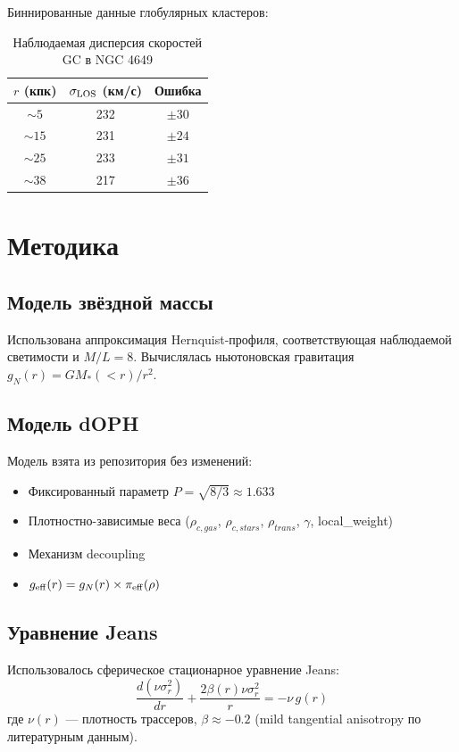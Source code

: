 \documentclass[12pt,a4paper]{article}
\begin{document}
Биннированные данные глобулярных кластеров:

\begin{table}[h]
\centering
\begin{tabular}{ccc}
\toprule
\( r \) (кпк) & \( \sigma_{\rm LOS} \) (км/с) & Ошибка \\
\midrule
\( \sim 5 \)   & 232 & \( \pm 30 \) \\
\( \sim 15 \)  & 231 & \( \pm 24 \) \\
\( \sim 25 \)  & 233 & \( \pm 31 \) \\
\( \sim 38 \)  & 217 & \( \pm 36 \) \\
\bottomrule
\end{tabular}
\caption{Наблюдаемая дисперсия скоростей GC в NGC 4649}
\label{tab:data}
\end{table}

\section{Методика}

\subsection{Модель звёздной массы}
Использована аппроксимация Hernquist-профиля, соответствующая наблюдаемой светимости и \( M/L=8 \). Вычислялась ньютоновская гравитация \( g_N(r) = GM_*(<r)/r^2 \).

\subsection{Модель dOPH}
Модель взята из репозитория без изменений:
\begin{itemize}
    \item Фиксированный параметр \( P = \sqrt{8/3} \approx 1.633 \)
    \item Плотностно-зависимые веса (\( \rho_{c,gas} \), \( \rho_{c,stars} \), \( \rho_{trans} \), \( \gamma \), local\_weight)
    \item Механизм decoupling
    \item \( g_{\rm eff}(r) = g_N(r) \times \pi_{\rm eff}(\rho) \)
\end{itemize}

\subsection{Уравнение Jeans}
Использовалось сферическое стационарное уравнение Jeans:
\begin{equation}
\frac{d(\nu \sigma_r^2)}{dr} + \frac{2\beta(r) \nu \sigma_r^2}{r} = -\nu \, g(r)
\end{equation}
где \( \nu(r) \) — плотность трассеров, \( \beta \approx -0.2 \) (mild tangential anisotropy по литературным данным).
\end{document}
